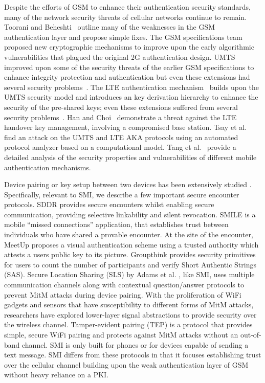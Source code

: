 \documentclass[letterpaper,twocolumn]{sig-alternate}
\begin{document}
Despite the efforts of GSM to enhance their authentication security standards, many of the network security threats of cellular networks continue to remain. Toorani and Beheshti~\cite{toorani2008solutions} outline many of the weaknesses in the GSM authentication layer and propose simple fixes. The GSM specifications team~\cite{arkko2006extensible,haverinen2006extensible} proposed new cryptographic mechanisms to improve upon the early algorithmic vulnerabilities that plagued the original 2G authentication design. UMTS improved upon some of the security threats of the earlier GSM specifications to enhance integrity protection and authentication but even these extensions had several security problems~\cite{mobarhan2012evaluation}. The LTE authentication mechanism~\cite{bikos2013lte} builds upon the UMTS security model and introduces an key derivation hierarchy to enhance the security of the pre-shared keys; even these extensions suffered from several security problems~\cite{bikos2013lte, han2014security,tsay2012vulnerability}. Han and Choi~\cite{han2014security} demonstrate a threat against the LTE handover key management, involving a compromised base station. Tsay et al.~\cite{tsay2012vulnerability} find an attack on the UMTS and LTE AKA protocols using an automated protocol analyzer based on a computational model. Tang et al.~\cite{tang2013analysis} provide a detailed analysis of the security properties and vulnerabilities of different mobile authentication mechanisms.

Device pairing or key setup between two devices has been extensively studied
\cite{balfanz2002talking,castelluccia2005shake,bump,holmquist2001smart,lester2004you}. Specifically, relevant to SMI, we describe a few important secure encounter protocols. SDDR \cite{lentz2014sddr} provides secure encounters whilst enabling secure communication, providing selective linkability and silent revocation. SMILE \cite{smile} is a mobile “missed connections” application, that establishes trust between individuals who have shared a provable encounter. At the site of the encounter, MeetUp \cite{securesocial} proposes a visual authentication scheme using a trusted authority which attests a users public key to its picture. Groupthink \cite{groupthink} provides security primitives for users to count the number of participants and verify Short Authentic Strings (SAS). Secure Location Sharing (SLS) by Adams et al. \cite{clouds}, like SMI, uses multiple communication channels along with contextual question/answer protocols to prevent MitM attacks during device pairing. With the proliferation of WiFi gadgets and sensors that have susceptibility to different forms of MitM attacks, researchers have explored lower-layer signal abstractions to provide security over the wireless channel. Tamper-evident pairing (TEP) \cite{securepairing} is a protocol that provides simple, secure WiFi pairing and protects against MitM attacks without an out-of-band channel. SMI is only built for phones or for devices capable of sending a text message. SMI differs from these protocols in that it focuses establishing trust over the cellular channel building upon the weak authentication layer of GSM without heavy reliance on a PKI.
\end{document}
